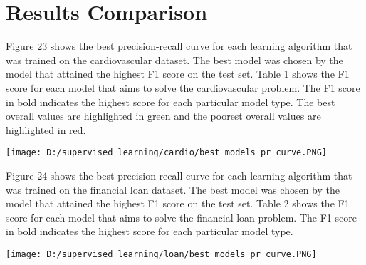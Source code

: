\documentclass[10pt,journal,compsoc]{IEEEtran}
\begin{document}
\section{Results Comparison}
Figure 23 shows the best precision-recall curve for each learning algorithm that was trained on the cardiovascular dataset. The best model was chosen by the model that attained the highest F1 score on the test set. Table 1 shows the F1 score for each model that aims to solve the cardiovascular problem. The F1 score in bold indicates the highest score for each particular model type. The best overall values are highlighted in green and the poorest overall values are highlighted in red.
\begin{center}
	\texttt{[image: D:/supervised\_learning/cardio/best\_models\_pr\_curve.PNG]}
\end{center}
Figure 24 shows the best precision-recall curve for each learning algorithm that was trained on the financial loan dataset. The best model was chosen by the model that attained the highest F1 score on the test set. Table 2 shows the F1 score for each model that aims to solve the financial loan problem. The F1 score in bold indicates the highest score for each particular model type.
\begin{center}
	\texttt{[image: D:/supervised\_learning/loan/best\_models\_pr\_curve.PNG]}
\end{center}
\end{document}
